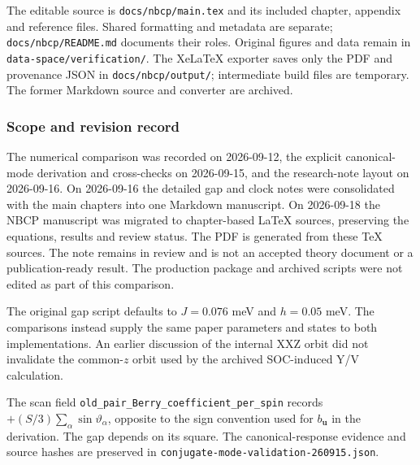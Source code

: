 The editable source is \texttt{docs/nbcp/main.tex} and its included
chapter, appendix and reference files. Shared formatting and metadata are
separate; \texttt{docs/nbcp/README.md} documents their roles. Original
figures and data remain in \texttt{data-space/verification/}. The XeLaTeX
exporter saves only the PDF and provenance JSON in
\texttt{docs/nbcp/output/}; intermediate build files are temporary.
The former Markdown source and converter are archived.

\subsubsection{Scope and revision
record}\label{scope-and-revision-record}

The numerical comparison was recorded on 2026-09-12, the explicit
canonical-mode derivation and cross-checks on 2026-09-15, and the
research-note layout on 2026-09-16. On 2026-09-16 the detailed gap and
clock notes were consolidated with the main chapters into one Markdown
manuscript. On 2026-09-18 the NBCP manuscript was migrated to chapter-based
LaTeX sources, preserving the equations, results and review status. The
PDF is generated from these TeX sources. The note remains in review and is not an accepted
theory document or a publication-ready result. The production package
and archived scripts were not edited as part of this comparison.

The original gap script defaults to \(J=0.076\) meV and \(h=0.05\) meV.
The comparisons instead supply the same paper parameters and states to
both implementations. An earlier discussion of the internal XXZ orbit
did not invalidate the common-\(z\) orbit used by the archived
SOC-induced Y/V calculation.

The scan field
{\small\texttt{\nolinkurl{old_pair_Berry_coefficient_per_spin}}} records
\(+(S/3)\sum_\alpha\sin\vartheta_\alpha\), opposite to the sign
convention used for \(b_{\mathbf u}\) in the derivation. The gap depends
on its square. The canonical-response evidence and source hashes are
preserved in
{\small\texttt{\nolinkurl{conjugate-mode-validation-260915.json}}}.
